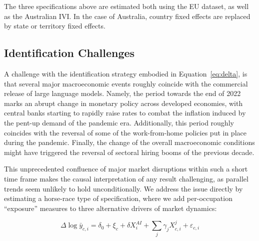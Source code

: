 \documentclass[11pt]{article}
\begin{document}
The three specifications above are estimated both using the EU dataset, as well as the Australian IVI. In the case of Australia, country fixed effects are replaced by state or territory fixed effects.

\subsection{Identification Challenges}
\label{sec:identification}

A challenge with the identification strategy embodied in Equation~\ref{eq:delta}, is that several major macroeconomic events roughly coincide with the commercial release of large language models. Namely, the period towards the end of 2022 marks an abrupt change in monetary policy across developed economies, with central banks starting to rapidly raise rates to combat the inflation induced by the pent-up demand of the pandemic era. Additionally, this period roughly coincides with the reversal of some of the work-from-home policies put in place during the pandemic. Finally, the change of the overall macroeconomic conditions might have triggered the reversal of sectoral hiring booms of the previous decade.

This unprecedented confluence of major market disruptions within such a short time frame makes the causal interpretation of any result challenging, as parallel trends seem unlikely to hold unconditionally. We address the issue directly by estimating a horse-race type of specification, where we add per-occupation ``exposure'' measures to three alternative drivers of market dynamics:

\begin{equation}
    \Delta\log{\bar{y}}_{c,i} = \delta_0 + \xi_c + \delta X^{AI}_i + \sum_{j} \gamma_j X^{j}_{c,i} + \varepsilon_{c,i}
\label{eq:horse_race}
\end{equation}
\end{document}
